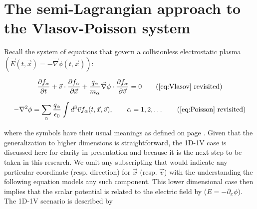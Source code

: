 \documentclass[11pt,titlepage]{report}
\begin{document}





\section{The semi-Lagrangian approach to the Vlasov-Poisson system}\label{section:The_semi_Lagrangian_approach_to_the_Vlasov_Poisson_system}

\indent \indent Recall the system of equations that govern a collisionless electrostatic plasma $ (\vec{E}(t,\vec{x}) = -\vec{\nabla}\phi(t,\vec{x}))$:

\begin{equation*}
\frac{\partial f_{\alpha}}{\partial t} + \vec{v}\cdot\frac{\partial f_{\alpha}}{\partial \vec{x}} + \frac{q_{\alpha}}{m_{\alpha}}\vec{\nabla}\phi\cdot\frac{\partial f_{\alpha}}{\partial \vec{v}} = 0 \tag{\ref{eq:Vlasov} revisited}\end{equation*}

\begin{equation*}-\nabla^2\phi = \sum_{\alpha}\frac{q_{\alpha}}{\epsilon_0}\int d^3\vec{v}f_{\alpha}(t,\vec{x},\vec{v}), \qquad \alpha = 1,2,\ldots  \tag{\ref{eq:Poisson} revisited}
\end{equation*}

\noindent where the symbols have their usual meanings as defined on page \pageref{page:defs}. Given that the generalization to higher dimensions is straightforward, the 1D-1V case is discussed here for clarity in presentation and because it is the next step to be taken in this research. We omit any subscripting that would indicate any particular coordinate (resp. direction) for $\vec{x}$ (resp. $\vec{v}$) with the understanding the following equation models any such component. This lower dimensional case then implies that the scalar potential is related to the electric field by ($E = -\partial_x \phi$). The 1D-1V scenario is described by
\end{document}
